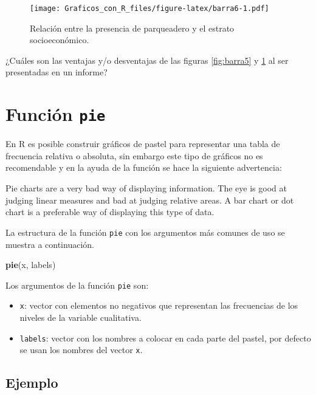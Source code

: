 \documentclass[10pt,]{krantz}
\makeatletter
\newenvironment{Shaded}{\begin{snugshade}}{\end{snugshade}}
\newcommand{\KeywordTok}[1]{\textcolor[rgb]{0.13,0.29,0.53}{\textbf{{#1}}}}
\newcommand{\NormalTok}[1]{{#1}}
\providecommand{\tightlist}{%
  \setlength{\itemsep}{0pt}\setlength{\parskip}{0pt}}
\let\proglang=\textsf
\newenvironment{kframe}{%
\medskip{}
\setlength{\fboxsep}{.8em}
 \def\at@end@of@kframe{}%
 \ifinner\ifhmode%
  \def\at@end@of@kframe{\end{minipage}}%
  \begin{minipage}{\columnwidth}%
 \fi\fi%
 \def\FrameCommand##1{\hskip\@totalleftmargin \hskip-\fboxsep
 \colorbox{shadecolor}{##1}\hskip-\fboxsep
     \hskip-\linewidth \hskip-\@totalleftmargin \hskip\columnwidth}%
 \MakeFramed {\advance\hsize-\width
   \@totalleftmargin\z@ \linewidth\hsize
   \@setminipage}}%
 {\par\unskip\endMakeFramed%
 \at@end@of@kframe}
\renewenvironment{Shaded}{\begin{kframe}}{\end{kframe}}
\let\BeginKnitrBlock\begin \let\EndKnitrBlock\end
\makeatother
\begin{document}
\begin{figure}[htbp]
\centering
\texttt{[image: Graficos\_con\_R\_files/figure-latex/barra6-1.pdf]}
\caption{\label{fig:barra6}Relación entre la presencia de parqueadero y el
estrato socioeconómico.}
\end{figure}

¿Cuáles son las ventajas y/o desventajas de las figuras \ref{fig:barra5}
y \ref{fig:barra6} al ser presentadas en un informe?

\section{\texorpdfstring{Función \texttt{pie} 
}{Función pie  }}\label{funcion-pie}

En \proglang{R} es posible construir gráficos de pastel para representar
una tabla de frecuencia relativa o absoluta, sin embargo este tipo de
gráficos no es recomendable y en la ayuda de la función se hace la
siguiente advertencia:

\BeginKnitrBlock{rmdwarning}
Pie charts are a very bad way of displaying information. The eye is good
at judging linear measures and bad at judging relative areas. A bar
chart or dot chart is a preferable way of displaying this type of data.
\EndKnitrBlock{rmdwarning}

La estructura de la función \texttt{pie} con los argumentos más comunes
de uso se muestra a continuación.

\begin{Shaded}
\begin{Highlighting}[]
\KeywordTok{pie}\NormalTok{(x, labels)}
\end{Highlighting}
\end{Shaded}

Los argumentos de la función \texttt{pie} son:

\begin{itemize}
\tightlist
\item
  \texttt{x}: vector con elementos no negativos que representan las
  frecuencias de los niveles de la variable cualitativa.
\item
  \texttt{labels}: vector con los nombres a colocar en cada parte del
  pastel, por defecto se usan los nombres del vector \texttt{x}.
\end{itemize}

\subsection*{Ejemplo}\label{ejemplo-23}
\end{document}
